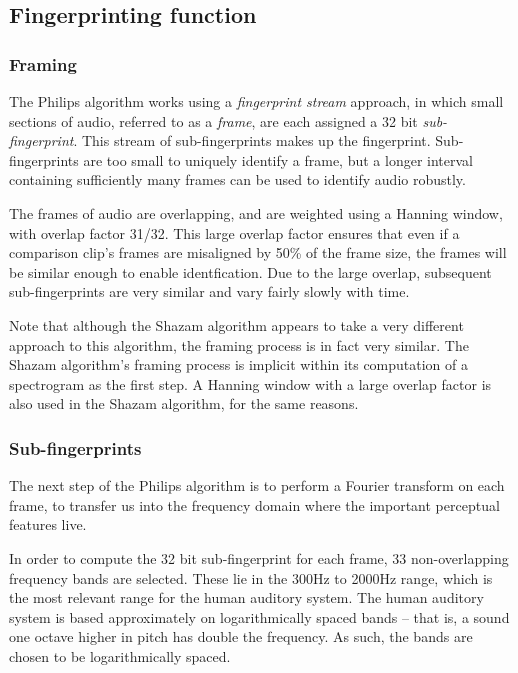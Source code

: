 \documentclass[12pt,a4paper,twoside,openright]{report}
\begin{document}
\subsection{Fingerprinting function}
\label{philips:fingerprinter}

\subsubsection{Framing}

The Philips algorithm works using a \textit{fingerprint stream} approach, in which small sections of audio, referred to as a \textit{frame}, are each assigned a 32 bit \textit{sub-fingerprint}. This stream of sub-fingerprints makes up the fingerprint. Sub-fingerprints are too small to uniquely identify a frame, but a longer interval containing sufficiently many frames can be used to identify audio robustly.

The frames of audio are overlapping, and are weighted using a Hanning window, with overlap factor 31/32. This large overlap factor ensures that even if a comparison clip's frames are misaligned by 50\% of the frame size, the frames will be similar enough to enable identfication. Due to the large overlap, subsequent sub-fingerprints are very similar and vary fairly slowly with time. 

Note that although the Shazam algorithm appears to take a very different approach to this algorithm, the framing process is in fact very similar. The Shazam algorithm's framing process is implicit within its computation of a spectrogram as the first step. A Hanning window with a large overlap factor is also used in the Shazam algorithm, for the same reasons.

\subsubsection{Sub-fingerprints}

The next step of the Philips algorithm is to perform a Fourier transform on each frame, to transfer us into the frequency domain where the important perceptual features live.

In order to compute the 32 bit sub-fingerprint for each frame, 33 non-overlapping frequency bands are selected. These lie in the 300Hz to 2000Hz range, which is the most relevant range for the human auditory system. The human auditory system is based approximately on logarithmically spaced bands -- that is, a sound one octave higher in pitch has double the frequency. As such, the bands are chosen to be logarithmically spaced.
\end{document}
